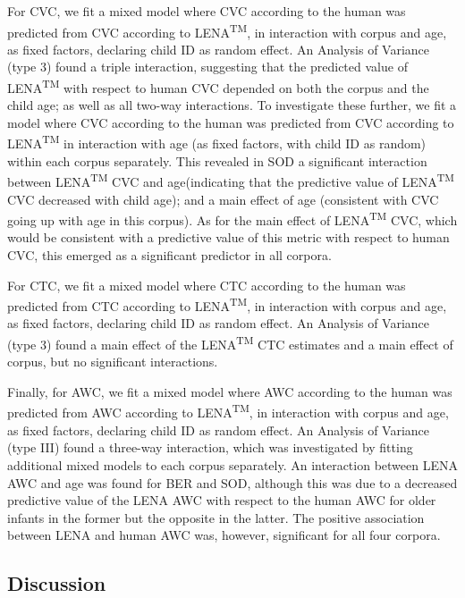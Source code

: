 \documentclass[english,floatsintext,man]{apa6}
\begin{document}
For CVC, we fit a mixed model where CVC according to the human was
predicted from CVC according to LENA\textsuperscript{TM}, in interaction
with corpus and age, as fixed factors, declaring child ID as random
effect. An Analysis of Variance (type 3) found a triple interaction,
suggesting that the predicted value of LENA\textsuperscript{TM} with
respect to human CVC depended on both the corpus and the child age; as
well as all two-way interactions. To investigate these further, we fit a
model where CVC according to the human was predicted from CVC according
to LENA\textsuperscript{TM} in interaction with age (as fixed factors,
with child ID as random) within each corpus separately. This revealed in
SOD a significant interaction between LENA\textsuperscript{TM} CVC and
age(indicating that the predictive value of LENA\textsuperscript{TM} CVC
decreased with child age); and a main effect of age (consistent with CVC
going up with age in this corpus). As for the main effect of
LENA\textsuperscript{TM} CVC, which would be consistent with a
predictive value of this metric with respect to human CVC, this emerged
as a significant predictor in all corpora.

For CTC, we fit a mixed model where CTC according to the human was
predicted from CTC according to LENA\textsuperscript{TM}, in interaction
with corpus and age, as fixed factors, declaring child ID as random
effect. An Analysis of Variance (type 3) found a main effect of the
LENA\textsuperscript{TM} CTC estimates and a main effect of corpus, but
no significant interactions.

Finally, for AWC, we fit a mixed model where AWC according to the human
was predicted from AWC according to LENA\textsuperscript{TM}, in
interaction with corpus and age, as fixed factors, declaring child ID as
random effect. An Analysis of Variance (type III) found a three-way
interaction, which was investigated by fitting additional mixed models
to each corpus separately. An interaction between LENA AWC and age was
found for BER and SOD, although this was due to a decreased predictive
value of the LENA AWC with respect to the human AWC for older infants in
the former but the opposite in the latter. The positive association
between LENA and human AWC was, however, significant for all four
corpora.

\subsection{Discussion}\label{discussion}
\end{document}
